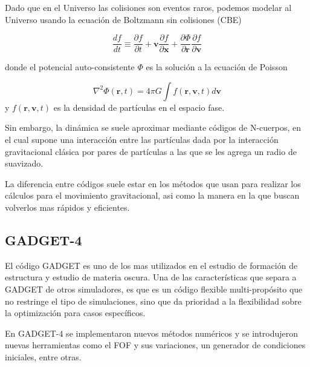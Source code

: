 \documentclass{beamer}
\begin{document}
	\begin{frame}
		Dado que en el Universo las colisiones son eventos raros, podemos modelar al Universo usando la  ecuación de Boltzmann sin colisiones (CBE)
	
		
		\begin{equation}
		    \frac{d f}{d t} \equiv \frac{\partial f}{\partial t} + \mathbf{v}\frac{\partial f}{\partial \mathbf{x}} + \frac{\partial \Phi}{\partial \mathbf{r}} \frac{\partial f}{\partial \mathbf{v}}
		    \label{eq:CBE}
		\end{equation}

		donde el potencial auto-consistente $\Phi$ es la solución a la ecuación de Poisson

		\begin{equation}
		    \nabla^2\Phi(\mathbf{r},t) = 4\pi G \int f(\mathbf{r},\mathbf{v},t)d\mathbf{v}
		    \label{eq:PoissonSol}
		\end{equation}
		\noindent y $f(\mathbf{r},\mathbf{v},t)$ es la densidad de partículas en el espacio fase.
	\end{frame}
	
	\begin{frame}
		Sin embargo, la dinámica se suele aproximar mediante códigos de N-cuerpos, en el cual supone una interacción entre las partículas dada por la interacción gravitacional clásica por pares de partículas a las que se les agrega un radio de suavizado.

		 La diferencia entre códigos suele estar en los métodos que usan para realizar los cálculos para el movimiento gravitacional, asi como la manera en la que buscan volverlos mas rápidos y eficientes.

	\end{frame}
\subsection{GADGET-4}
	\begin{frame}
		El código GADGET es uno de los mas utilizados en el estudio de formación de estructura y estudio de materia oscura. Una de las características que separa a GADGET de otros simuladores, es que es un código flexible multi-propósito que no restringe el tipo de simulaciones, sino que da prioridad a la flexibilidad sobre la optimización para casos específicos.
		
		En GADGET-4 se implementaron nuevos métodos numéricos y se introdujeron nuevas herramientas como el FOF y sus variaciones, un generador de condiciones iniciales, entre otras.

	\end{frame}
	
\end{document}
